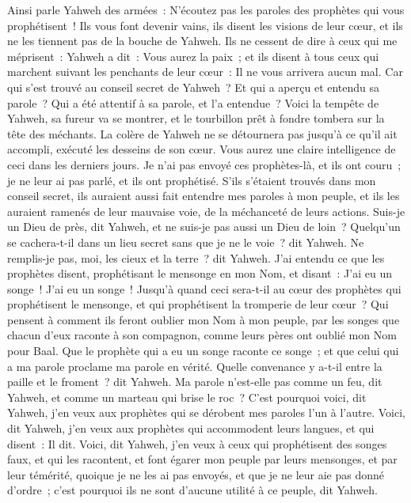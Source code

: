 \begin{multicols}{2}
Ainsi parle Yahweh des armées~: N'écoutez pas les paroles des prophètes qui vous prophétisent~! Ils vous font devenir vains, ils disent les visions de leur cœur, et ils ne les tiennent pas de la bouche de Yahweh.
Ils ne cessent de dire à ceux qui me méprisent~: Yahweh a dit~: Vous aurez la paix~; et ils disent à tous ceux qui marchent suivant les penchants de leur cœur~: Il ne vous arrivera aucun mal.
Car qui s'est trouvé au conseil secret de Yahweh~? Et qui a aperçu et entendu sa parole~? Qui a été attentif à sa parole, et l'a entendue~?
Voici la tempête de Yahweh, sa fureur va se montrer, et le tourbillon prêt à fondre tombera sur la tête des méchants.
La colère de Yahweh ne se détournera pas jusqu'à ce qu'il ait accompli, exécuté les desseins de son cœur. Vous aurez une claire intelligence de ceci dans les derniers jours.
Je n'ai pas envoyé ces prophètes-là, et ils ont couru~; je ne leur ai pas parlé, et ils ont prophétisé.
S'ils s'étaient trouvés dans mon conseil secret, ils auraient aussi fait entendre mes paroles à mon peuple, et ils les auraient ramenés de leur mauvaise voie, de la méchanceté de leurs actions.
Suis-je un Dieu de près, dit Yahweh, et ne suis-je pas aussi un Dieu de loin~?
Quelqu'un se cachera-t-il dans un lieu secret sans que je ne le voie~? dit Yahweh. Ne remplis-je pas, moi, les cieux et la terre~? dit Yahweh.
J'ai entendu ce que les prophètes disent, prophétisant le mensonge en mon Nom, et disant~: J'ai eu un songe~! J'ai eu un songe~!
Jusqu'à quand ceci sera-t-il au cœur des prophètes qui prophétisent le mensonge, et qui prophétisent la tromperie de leur cœur~?
Qui pensent à comment ils feront oublier mon Nom à mon peuple, par les songes que chacun d'eux raconte à son compagnon, comme leurs pères ont oublié mon Nom pour Baal.
Que le prophète qui a eu un songe raconte ce songe~; et que celui qui a ma parole proclame ma parole en vérité. Quelle convenance y a-t-il entre la paille et le froment~? dit Yahweh.
Ma parole n'est-elle pas comme un feu, dit Yahweh, et comme un marteau qui brise le roc~?
C'est pourquoi voici, dit Yahweh, j'en veux aux prophètes qui se dérobent mes paroles l'un à l'autre.
Voici, dit Yahweh, j'en veux aux prophètes qui accommodent leurs langues, et qui disent~: Il dit.
Voici, dit Yahweh, j'en veux à ceux qui prophétisent des songes faux, et qui les racontent, et font égarer mon peuple par leurs mensonges, et par leur témérité, quoique je ne les ai pas envoyés, et que je ne leur aie pas donné d'ordre~; c'est pourquoi ils ne sont d'aucune utilité à ce peuple, dit Yahweh.

\end{multicols}
